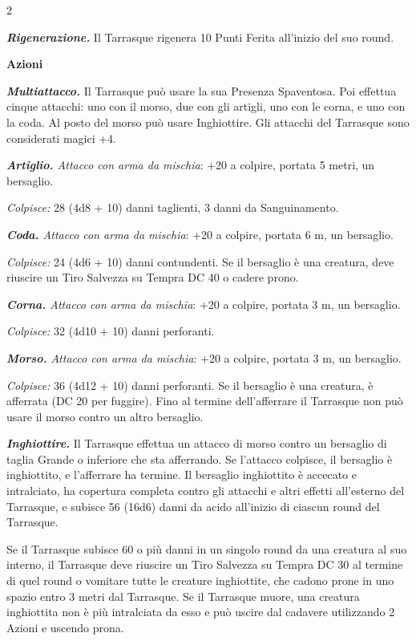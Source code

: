 \begin{multicols}{2}
{\emph{\textbf{Rigenerazione.}} Il Tarrasque rigenera 10 Punti Ferita all'inizio del suo round.

\textbf{Azioni}

\emph{\textbf{Multiattacco.}} Il Tarrasque può usare la sua Presenza Spaventosa. Poi effettua cinque attacchi: uno con il morso, due con gli artigli, uno con le corna, e uno con la coda. Al posto del morso può usare Inghiottire. Gli attacchi del Tarrasque sono considerati magici +4.

\emph{\textbf{Artiglio.} Attacco con arma da mischia}: +20 a colpire, portata 5 metri, un bersaglio.

\emph{Colpisce:} 28 (4d8 + 10) danni taglienti, 3 danni da Sanguinamento.

\emph{\textbf{Coda.} Attacco con arma da mischia}: +20 a colpire, portata 6 m, un bersaglio.

\emph{Colpisce:} 24 (4d6 + 10) danni contundenti. Se il bersaglio è una creatura, deve riuscire un Tiro Salvezza su Tempra DC 40 o cadere prono.

\emph{\textbf{Corna.} Attacco con arma da mischia}: +20 a colpire, portata 3 m, un bersaglio.

\emph{Colpisce:} 32 (4d10 + 10) danni perforanti.

\emph{\textbf{Morso.} Attacco con arma da mischia}: +20 a colpire, portata 3 m, un bersaglio.

\emph{Colpisce:} 36 (4d12 + 10) danni perforanti. Se il bersaglio è una creatura, è afferrata (DC 20 per fuggire). Fino al termine dell'afferrare il Tarrasque non può usare il morso contro un altro bersaglio.

\emph{\textbf{Inghiottire.}} Il Tarrasque effettua un attacco di morso contro un bersaglio di taglia Grande o inferiore che sta afferrando. Se l'attacco colpisce, il bersaglio è inghiottito, e l'afferrare ha termine. Il bersaglio inghiottito è accecato e intralciato, ha copertura completa contro gli attacchi e altri effetti all'esterno del Tarrasque, e subisce 56 (16d6) danni da acido all'inizio di ciascun round del Tarrasque.

Se il Tarrasque subisce 60 o più danni in un singolo round da una creatura al suo interno, il Tarrasque deve riuscire un Tiro Salvezza su Tempra DC 30 al termine di quel round o vomitare tutte le creature inghiottite, che cadono prone in uno spazio entro 3 metri dal Tarrasque. Se il Tarrasque muore, una creatura inghiottita non è più intralciata da esso e può uscire dal cadavere utilizzando 2 Azioni e uscendo prona.

}
\end{multicols}
